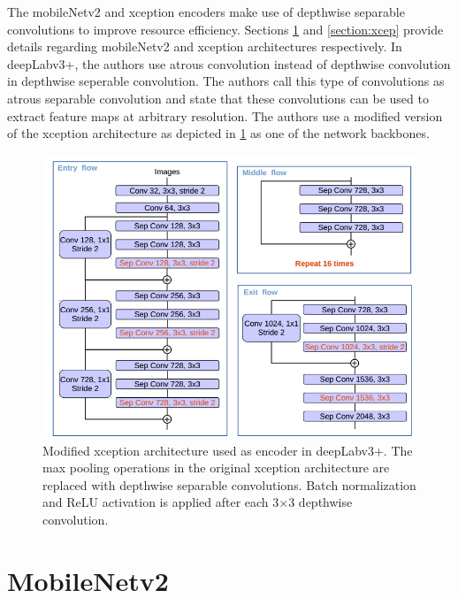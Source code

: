The mobileNetv2 and xception encoders make use of depthwise separable convolutions to improve resource efficiency. Sections \ref{section:mn} and \ref{section:xcep} provide details regarding mobileNetv2 and xception architectures respectively. In deepLabv3+, the authors use atrous convolution instead of depthwise convolution in depthwise seperable convolution. The authors call this type of convolutions as atrous separable convolution and state that these convolutions can be used to extract feature maps at arbitrary resolution. The authors use a modified version of the xception architecture as depicted in \ref{Fig:deepLabv4_xcep} as one of the network backbones.

	\begin{figure}
		\centering
		\includegraphics[width=.8\linewidth]{images/deepLabv4_xcep}
		\caption{Modified xception architecture used as encoder in deepLabv3+. The max pooling operations in the original xception architecture are replaced with depthwise separable convolutions. Batch normalization and ReLU activation is applied after each 3$\times$3 depthwise convolution.}
		\label{Fig:deepLabv4_xcep}
	\end{figure}

\section{MobileNetv2}
\label{section:mn}





